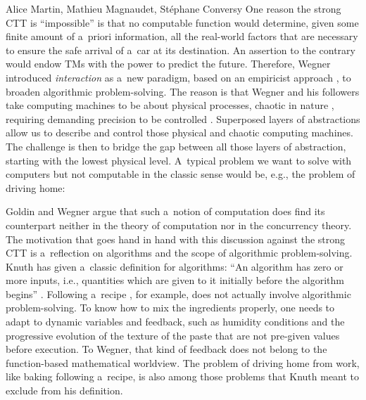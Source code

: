 \begin{artengenv2auth}{Alice Martin, Mathieu Magnaudet, Stéphane Conversy}
One reason the strong CTT is ``impossible'' \parencite{Eberbach2004} is that no computable function would determine, given some finite amount of a~priori information, all the real-world factors that are necessary to ensure the safe arrival of a~car at its destination. An assertion to the contrary would endow TMs with the power to predict the future. 
Therefore, Wegner introduced \textit{interaction} as a~new paradigm, based on an empiricist approach \parencite{Wegner1995}, to broaden algorithmic problem-solving. The reason is that Wegner and his followers take computing machines to be about physical processes, chaotic in nature \parencite{Siegelmann1995}, requiring demanding precision to be controlled \parencite{Hartmanis1994}. Superposed layers of abstractions allow us to describe and control those physical and chaotic computing machines. The challenge is then to bridge the gap between all those layers of abstraction, starting with the lowest physical level. A~typical problem we want to solve with computers but not computable in the classic sense would be, e.g., the problem of driving home: 


Goldin and Wegner argue that such a~notion of computation does find its counterpart neither in the theory of computation nor in the concurrency theory.
The motivation that goes hand in hand with this discussion against the strong CTT is a~reflection on algorithms and the scope of algorithmic problem-solving. Knuth has given a~classic definition for algorithms: ``An algorithm has zero or more inputs, i.e., quantities which are given to it initially before the algorithm begins'' \parencite{Knuth1968}. Following a~recipe \parencite{Knuth1968}, for example, does not actually involve algorithmic problem-solving. To know how to mix the ingredients properly, one needs to adapt to dynamic variables and feedback, such as humidity conditions and the progressive evolution of the texture of the paste that are not pre-given values before execution. To Wegner, that kind of feedback does not belong to the function-based mathematical worldview. The problem of driving home from work, like baking following a~recipe, is also among those problems that Knuth meant to exclude from his definition. 


\end{artengenv2auth}

